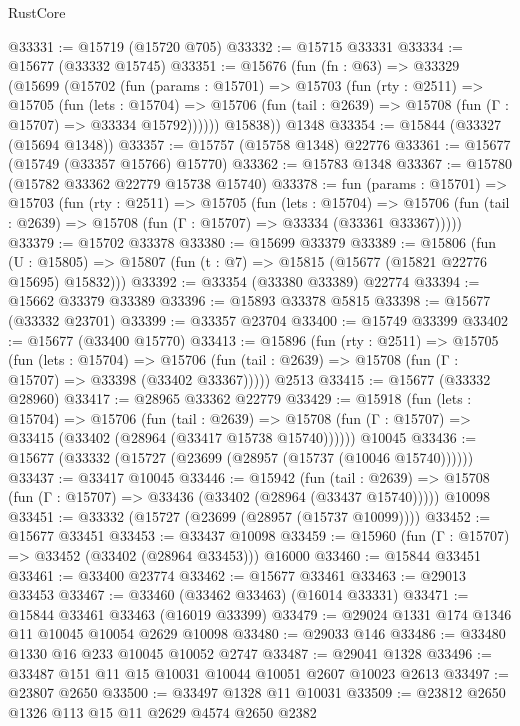 \begin{lexlean}{RustCore}
\begin{coremodule}
@33331 := @15719 (@15720 @705)
@33332 := @15715 @33331
@33334 := @15677 (@33332 @15745)
@33351 := @15676
    (fun (fn : @63) =>
    @33329
      (@15699
        (@15702
          (fun (params : @15701) =>
          @15703
            (fun (rty : @2511) =>
            @15705
              (fun (lets : @15704) =>
              @15706 (fun (tail : @2639) => @15708 (fun (Γ : @15707) => @33334 @15792))))))
        @15838))
    @1348
@33354 := @15844 (@33327 (@15694 @1348))
@33357 := @15757 (@15758 @1348) @22776
@33361 := @15677 (@15749 (@33357 @15766) @15770)
@33362 := @15783 @1348
@33367 := @15780 (@15782 @33362 @22779 @15738 @15740)
@33378 := fun (params : @15701) =>
  @15703
    (fun (rty : @2511) =>
    @15705
      (fun (lets : @15704) =>
      @15706 (fun (tail : @2639) => @15708 (fun (Γ : @15707) => @33334 (@33361 @33367)))))
@33379 := @15702 @33378
@33380 := @15699 @33379
@33389 := @15806
    (fun (U : @15805) => @15807 (fun (t : @7) => @15815 (@15677 (@15821 @22776 @15695) @15832)))
@33392 := @33354 (@33380 @33389) @22774
@33394 := @15662 @33379 @33389
@33396 := @15893 @33378 @5815
@33398 := @15677 (@33332 @23701)
@33399 := @33357 @23704
@33400 := @15749 @33399
@33402 := @15677 (@33400 @15770)
@33413 := @15896
    (fun (rty : @2511) =>
    @15705
      (fun (lets : @15704) =>
      @15706 (fun (tail : @2639) => @15708 (fun (Γ : @15707) => @33398 (@33402 @33367)))))
    @2513
@33415 := @15677 (@33332 @28960)
@33417 := @28965 @33362 @22779
@33429 := @15918
    (fun (lets : @15704) =>
    @15706
      (fun (tail : @2639) =>
      @15708 (fun (Γ : @15707) => @33415 (@33402 (@28964 (@33417 @15738 @15740))))))
    @10045
@33436 := @15677 (@33332 (@15727 (@23699 (@28957 (@15737 (@10046 @15740))))))
@33437 := @33417 @10045
@33446 := @15942
    (fun (tail : @2639) => @15708 (fun (Γ : @15707) => @33436 (@33402 (@28964 (@33437 @15740)))))
    @10098
@33451 := @33332 (@15727 (@23699 (@28957 (@15737 @10099))))
@33452 := @15677 @33451
@33453 := @33437 @10098
@33459 := @15960 (fun (Γ : @15707) => @33452 (@33402 (@28964 @33453))) @16000
@33460 := @15844 @33451
@33461 := @33400 @23774
@33462 := @15677 @33461
@33463 := @29013 @33453
@33467 := @33460 (@33462 @33463) (@16014 @33331)
@33471 := @15844 @33461 @33463 (@16019 @33399)
@33479 := @29024 @1331 @174 @1346 @11 @10045 @10054 @2629 @10098
@33480 := @29033 @146
@33486 := @33480 @1330 @16 @233 @10045 @10052 @2747
@33487 := @29041 @1328
@33496 := @33487 @151 @11 @15 @10031 @10044 @10051 @2607 @10023 @2613
@33497 := @23807 @2650
@33500 := @33497 @1328 @11 @10031
@33509 := @23812 @2650 @1326 @113 @15 @11 @2629 @4574 @2650 @2382

\end{coremodule}
\end{lexlean}
